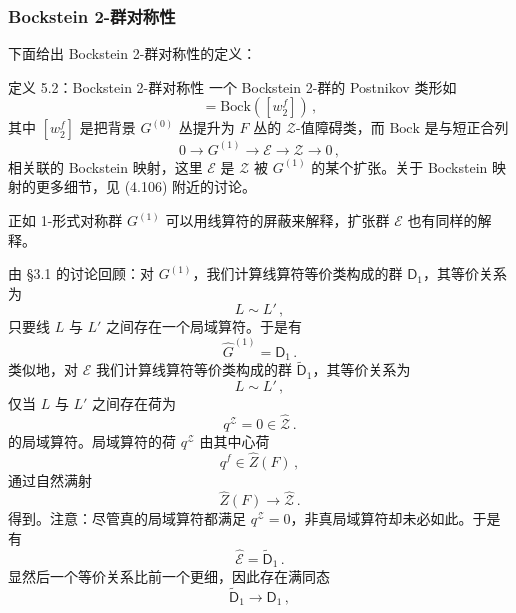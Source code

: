 \subsubsection{Bockstein 2-群对称性}
下面给出 Bockstein 2-群对称性的定义：
\begin{definitionbox}{定义 5.2：Bockstein 2-群对称性}
一个 Bockstein 2-群的 Postnikov 类形如
\begin{equation}
  [\Theta] = \mathrm{Bock}\left(\left[w_2^f\right]\right)\,, \tag{5.70}
\end{equation}
其中 $\left[w_2^f\right]$ 是把背景 $G^{(0)}$ 丛提升为 $F$ 丛的 $\mathcal{Z}$-值障碍类，而 $\mathrm{Bock}$ 是与短正合列
\begin{equation}
  0 \to G^{(1)} \to \mathcal{E} \to \mathcal{Z} \to 0\,, \tag{5.71}
\end{equation}
相关联的 Bockstein 映射，这里 $\mathcal{E}$ 是 $\mathcal{Z}$ 被 $G^{(1)}$ 的某个扩张。关于 Bockstein 映射的更多细节，见 (4.106) 附近的讨论。
\end{definitionbox}

正如 1-形式对称群 $G^{(1)}$ 可以用线算符的屏蔽来解释，扩张群 $\mathcal{E}$ 也有同样的解释。

由 §3.1 的讨论回顾：对 $G^{(1)}$，我们计算线算符等价类构成的群 $\mathsf{D}_1$，其等价关系为
\begin{equation}
  L \sim L'\,, \tag{5.72}
\end{equation}
只要线 $L$ 与 $L'$ 之间存在一个局域算符。于是有
\begin{equation}
  \widehat{G}^{(1)} = \mathsf{D}_1\,. \tag{5.73}
\end{equation}
类似地，对 $\mathcal{E}$ 我们计算线算符等价类构成的群 $\widetilde{\mathsf{D}}_1$，其等价关系为
\begin{equation}
  L \sim L'\,, \tag{5.74}
\end{equation}
仅当 $L$ 与 $L'$ 之间存在荷为
\begin{equation}
  q^{\mathcal{Z}} = 0 \in \widehat{\mathcal{Z}}\,. \tag{5.75}
\end{equation}
的局域算符。局域算符的荷 $q^{\mathcal{Z}}$ 由其中心荷
\begin{equation}
  q^f \in \widehat{Z}(F)\,, \tag{5.76}
\end{equation}
通过自然满射
\begin{equation}
  \widehat{Z}(F) \to \widehat{\mathcal{Z}}\,. \tag{5.77}
\end{equation}
得到。注意：尽管真的局域算符都满足 $q^{\mathcal{Z}} = 0$，非真局域算符却未必如此。于是有
\begin{equation}
  \widehat{\mathcal{E}} = \widetilde{\mathsf{D}}_1\,. \tag{5.78}
\end{equation}
显然后一个等价关系比前一个更细，因此存在满同态
\begin{equation}
  \widetilde{\mathsf{D}}_1 \to \mathsf{D}_1\,, \tag{5.79}
\end{equation}

